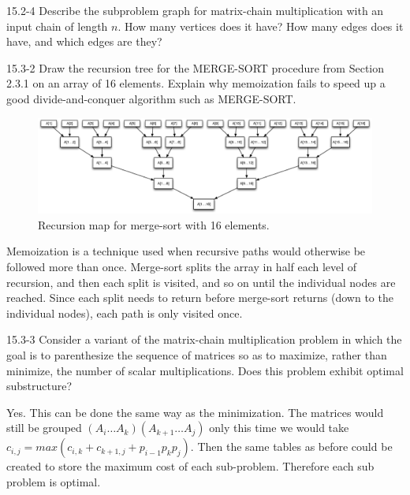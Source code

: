 \begin{problem}{15.2-4}
  Describe the subproblem graph for matrix-chain multiplication with an input chain of length $n$. How many vertices
  does it have? How many edges does it have, and which edges are they?
\end{problem}

\begin{problem}{15.3-2}
  Draw the recursion tree for the MERGE-SORT procedure from Section 2.3.1 on an array of 16 elements. Explain why
  memoization fails to speed up a good divide-and-conquer algorithm such as MERGE-SORT.
  \begin{solution}
    \begin{figure}[H]
      \centering
      \caption{Recursion map for merge-sort with 16 elements.}
      \includegraphics[scale=.35]{15_3_2.eps}
    \end{figure}
    Memoization is a technique used when recursive paths would otherwise be followed more than once. Merge-sort splits
    the array in half each level of recursion, and then each split is visited, and so on until the individual nodes are
    reached. Since each split needs to return before merge-sort returns (down to the individual nodes), each path is
    only visited once.
  \end{solution}
\end{problem}

\begin{problem}{15.3-3}
  Consider a variant of the matrix-chain multiplication problem in which the goal is to parenthesize the sequence of
  matrices so as to maximize, rather than minimize, the number of scalar multiplications. Does this problem exhibit
  optimal substructure?
  \begin{solution}
    Yes. This can be done the same way as the minimization. The matrices would still be grouped $(A_i \ldots A_k)(A_{k +
    1} \ldots A_j)$ only this time we would take $c_{i,j} = max(c_{i,k} + c_{k+1,j} + p_{i - 1}p_kp_j)$. Then the same
    tables as before could be created to store the maximum cost of each sub-problem. Therefore each sub problem is
    optimal.
  \end{solution}
\end{problem}



